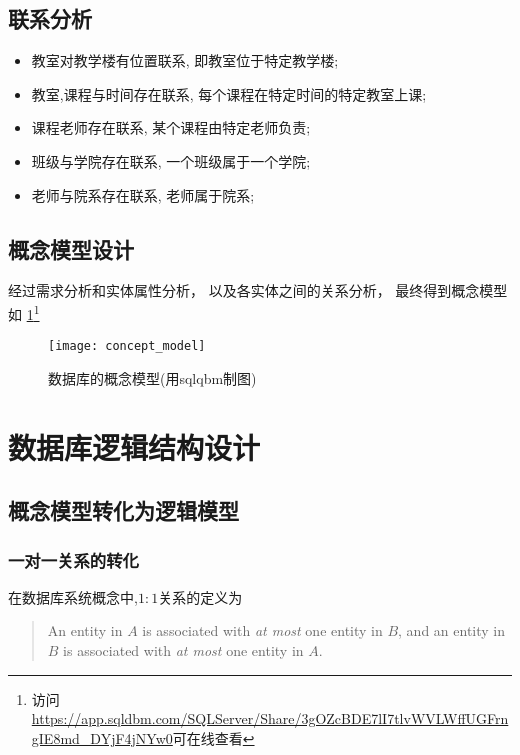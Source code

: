 \documentclass{myreport}
\begin{document}
  \subsection{联系分析}

    \begin{itemize}
      \item 教室对教学楼有位置联系, 即教室位于特定教学楼;
      \item 教室,课程与时间存在联系, 每个课程在特定时间的特定教室上课;
      \item 课程老师存在联系, 某个课程由特定老师负责;
      \item 班级与学院存在联系, 一个班级属于一个学院;
      \item 老师与院系存在联系, 老师属于院系;
    \end{itemize}


  \subsection{概念模型设计}
    经过需求分析和实体属性分析，
    以及各实体之间的关系分析，
    最终得到概念模型如
    \cref{fig:concept_model}\footnote{访问\url{https://app.sqldbm.com/SQLServer/Share/3gOZcBDE7lI7tlvWVLWffUGFrngIE8md_DYjF4jNYw0}可在线查看}
    \begin{figure}[H]
      \centering
      \texttt{[image: concept\_model]}
      \caption{数据库的概念模型(用sqlqbm制图)}
      \label{fig:concept_model}
    \end{figure}


\section{数据库逻辑结构设计}
  \subsection{概念模型转化为逻辑模型}
    \subsubsection{一对一关系的转化}
      在数据库系统概念中,$1:1$关系的定义为
      \begin{quote}
        An entity in $A$ is associated with \emph{at most} one entity in $B$,
        and an entity in $B$ is associated with \emph{at most} one entity in $A$.
      \end{quote}
\end{document}
